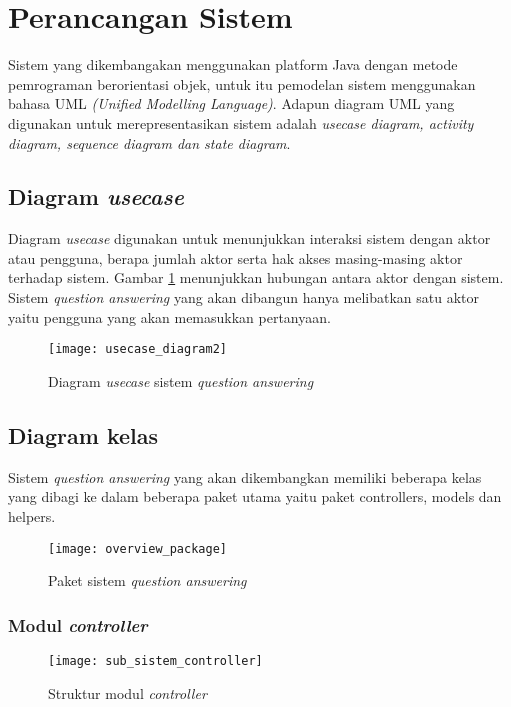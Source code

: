 \section{Perancangan Sistem}
Sistem yang dikembangakan menggunakan platform Java dengan metode pemrograman berorientasi objek, untuk itu pemodelan sistem menggunakan bahasa UML \emph{(Unified Modelling Language)}. Adapun diagram UML yang digunakan untuk merepresentasikan sistem adalah \emph{usecase diagram, activity diagram, sequence diagram dan state diagram}. 

\subsection{Diagram \emph{usecase}}
Diagram \emph{usecase} digunakan untuk menunjukkan interaksi sistem dengan aktor atau pengguna, berapa jumlah aktor serta hak akses masing-masing aktor terhadap sistem. Gambar \ref{fig:usecase_diagram} menunjukkan hubungan antara aktor dengan sistem. Sistem \emph{question answering} yang akan dibangun hanya melibatkan satu aktor yaitu pengguna yang akan memasukkan pertanyaan.

\begin{figure}[ht]
    \centering
    \texttt{[image: usecase\_diagram2]}
    \caption{Diagram \emph{usecase} sistem \emph{question answering}}
    \label{fig:usecase_diagram}
\end{figure}

\subsection{Diagram kelas}
Sistem \emph{question answering} yang akan dikembangkan memiliki beberapa kelas yang dibagi ke dalam beberapa paket utama yaitu paket controllers, models dan helpers.

\begin{figure}[tb]
    \centering
    \texttt{[image: overview\_package]}
    \caption{Paket sistem \emph{question answering}}
    \label{fig:overview_package}
\end{figure}

\subsubsection{Modul \emph{controller}}

\begin{figure}[tb]
    \centering
    \texttt{[image: sub\_sistem\_controller]}
    \caption{Struktur modul \emph{controller}} 
    \label{fig:sub_sistem_controller}
\end{figure}

